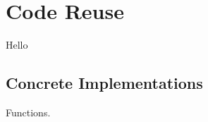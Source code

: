 \chapter{Code Reuse}

Hello

\section{Concrete Implementations}

\csharpsubsection{\csharp}

\begin{syntaxfloat}
  
  \caption{Functions.}
  \label{syntax:fun}
\end{syntaxfloat}



